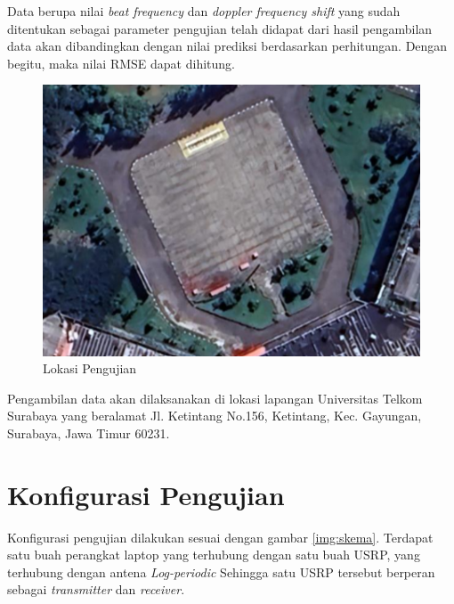 Data berupa nilai \textit{beat frequency} dan \textit{doppler frequency shift} yang sudah ditentukan sebagai parameter pengujian telah didapat dari hasil pengambilan data akan dibandingkan dengan nilai prediksi berdasarkan perhitungan. Dengan begitu, maka nilai RMSE dapat dihitung.

\begin{figure}
	\begin{center}
		\includegraphics[scale=0.45]{pics/bab3/petaPengujian.png}
		\caption{Lokasi Pengujian}
		\label{img:petaUji}
	\end{center}
\end{figure}

Pengambilan data akan dilaksanakan di lokasi lapangan Universitas Telkom Surabaya yang beralamat Jl. Ketintang No.156, Ketintang, Kec. Gayungan, Surabaya, Jawa Timur 60231.

\section{Konfigurasi Pengujian}
Konfigurasi pengujian dilakukan sesuai dengan gambar \ref{img:skema}. Terdapat satu buah perangkat laptop yang terhubung dengan satu buah USRP, yang terhubung dengan antena \textit{Log-periodic} Sehingga satu USRP tersebut berperan sebagai \textit{transmitter} dan \textit{receiver}.

